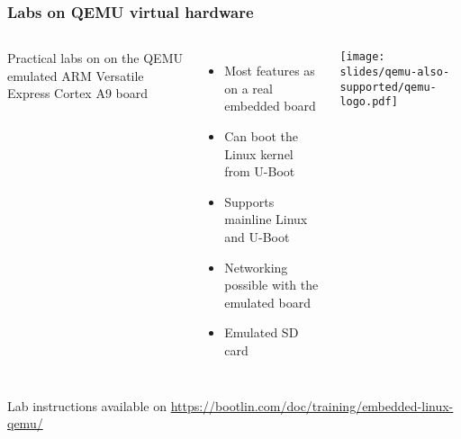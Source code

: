 \begin{frame}
\frametitle{Labs on QEMU virtual hardware}
  \begin{columns}
    Practical labs on on the QEMU emulated
    ARM Versatile Express Cortex A9 board
    \begin{itemize}
    \item Most features as on a real embedded board
    \item Can boot the Linux kernel from U-Boot
    \item Supports mainline Linux and U-Boot
    \item Networking possible with the emulated board
    \item Emulated SD card
    \end{itemize}
    \texttt{[image: slides/qemu-also-supported/qemu-logo.pdf]}
  \end{columns}
  \vspace{1cm}
  Lab instructions available on
  \url{https://bootlin.com/doc/training/embedded-linux-qemu/}
\end{frame}
